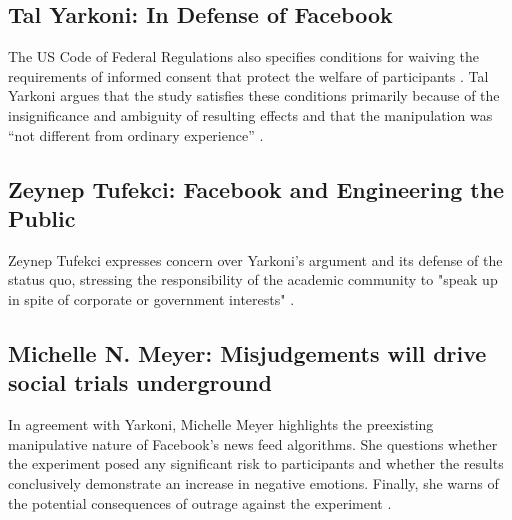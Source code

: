 \subsection{Tal Yarkoni: In Defense of Facebook}
The US Code of Federal Regulations also specifies conditions for waiving the requirements of informed consent that protect the welfare of participants \cite{csrwaive}.  Tal Yarkoni argues that the study satisfies these conditions primarily because of the insignificance and ambiguity of resulting effects \cite{defense} and that the manipulation was “not different from ordinary experience” \cite{defensedefense}.

\subsection{Zeynep Tufekci: Facebook and Engineering the Public}
Zeynep Tufekci expresses concern over Yarkoni's argument and its defense of the status quo, stressing the responsibility of the academic community to "speak up in spite of corporate or government interests" \cite{engineering}.

\subsection{Michelle N. Meyer: Misjudgements will drive social trials underground}
In agreement with Yarkoni, Michelle Meyer highlights the preexisting manipulative nature of Facebook's news feed algorithms.  She questions whether the experiment posed any significant risk to participants and whether the results conclusively demonstrate an increase in negative emotions.  Finally, she warns of the potential consequences of outrage against the experiment \cite{misjudgements}.
\vspace{0.4cm}